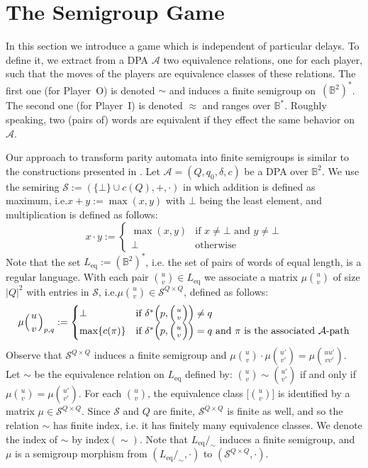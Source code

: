 \documentclass[fleqn,envcountsame]{LMCS}
\newcommand{\aut}[1]{\ensuremath{\mathcal{#1}}}
\newcommand{\pI}{Player~I\xspace}
\newcommand{\pO}{Player~O\xspace}
\newcommand{\Leq}{\ensuremath{L_{\mathrm{eq}}}\xspace}
\newcommand{\Bst}{\ensuremath{\mathbb{B}^*}\xspace}
\newcommand{\Bsq}{\ensuremath{\mathbb{B}^2}\xspace}
\newcommand{\Bsqst}{\ensuremath{(\mathbb{B}^2)^*}\xspace}
\newcommand{\ie}{i.e.\xspace}
\newcommand{\Index}{\mathrm{index}}
\let\obinom\binom
\renewcommand\binom[2]{
  \Big( { {{#1}} \atop {{#2}} } \Big)
}
\begin{document}
\section{The Semigroup Game}\label{sec:semigroup_game}

In this section we introduce a game which is independent of particular delays.
To define it, we extract from a DPA \aut{A} two equivalence relations,
one for each player, such that the moves of the players are equivalence classes of
these relations. The first one (for \pO) is denoted $\sim$ and induces
a finite semigroup on~\Bsqst. The second one (for \pI)
is denoted $\approx$ and ranges over \Bst.
Roughly speaking, two (pairs of) words are equivalent
if they effect the same behavior on~\aut{A}.

Our approach to transform parity automata into finite semigroups
is similar to the constructions presented in \cite{PP95SemInfinite,Pin95FiniteSem}.
Let $\aut{A}=(Q,q_0,\delta,c)$ be a DPA over \Bsq.
We use the semiring $\mathcal{S}:=(\{\bot\}\cup c(Q),+,\cdot)$ in
which addition is defined as maximum, \ie $x+y:=\max(x,y)$ with $\bot$
being the least element, and multiplication is defined as follows:
\[ x\cdot y:=\begin{cases}
    \max(x,y) & \text{if }x\neq\bot\text{ and }y\neq\bot\\
    \bot & \text{otherwise}
  \end{cases}
\]
Note that the set $\Leq:=\Bsqst$, \ie the set of pairs of words of equal length, is a regular language.
With each pair $\obinom{u}{v} \in \Leq$ we associate a matrix $\mu\obinom{u}{v}$
of size $|Q|^2$ with entries in $\mathcal{S}$, \ie $\mu\obinom{u}{v}\in\mathcal{S}^{Q\times Q}$,
defined as follows:
\[ \mu\obinom{u}{v}_{p,q} := \begin{cases}
      \bot & \text{if }\delta^*\Big(p,\binom{u}{v}\Big)\neq q\\
      \max \{c(\pi)\} & \text{if }\delta^*\Big(p,\binom{u}{v}\Big)=q
        \text{ and }\pi\text{ is the associated \aut{A}-path}
   \end{cases}
\]
Observe that $\mathcal{S}^{Q\times Q}$ induces a finite semigroup and
$\mu\obinom{u}{v} \cdot \mu\obinom{u'}{v'} = \mu\obinom{uu'}{vv'}$.
Let $\sim$ be the equivalence relation on \Leq defined by:
$\obinom{u}{v}\sim\obinom{u'}{v'}$ if and only if $\mu\obinom{u}{v}=\mu\obinom{u'}{v'}$.
For each $\obinom{u}{v}$, the equivalence class $\big[\obinom{u}{v}\big]$ is identified by
a matrix $\mu \in \mathcal{S}^{Q\times Q}$. Since $\mathcal{S}$ and $Q$
are finite, $\mathcal{S}^{Q\times Q}$ is finite as well, and so the
relation $\sim$ has finite index, \ie it has finitely many equivalence classes.
We denote the index of $\sim$ by $\Index(\sim)$. Note that $\Leq/_{\sim}$
induces a finite semigroup, and $\mu$ is a semigroup morphism from
$(\Leq/_{\sim},\cdot)$ to $(\mathcal{S}^{Q\times Q},\cdot)$.
\end{document}
